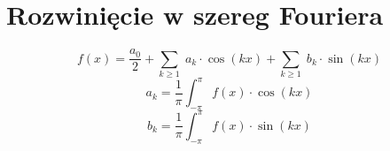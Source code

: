 \section{Rozwinięcie w szereg Fouriera}
\[
    f(x) = \frac{a_0}{2} + \sum_{k \geq 1}\; a_k \cdot \cos(kx) + \sum_{k \geq 1}\; b_k \cdot \sin(kx)
\]
\[
    a_k = \frac{1}{\pi} \int_{-\pi}^{\pi} f(x)\cdot\cos(kx)
\]
\[
    b_k = \frac{1}{\pi} \int_{-\pi}^{\pi} f(x)\cdot\sin(kx)
\]
